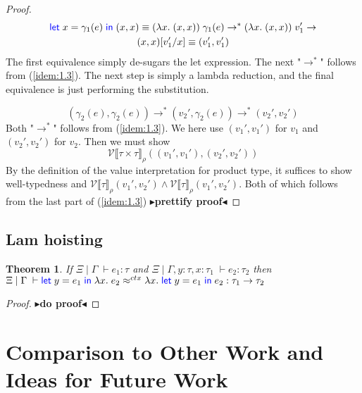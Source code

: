 \documentclass[twoside,11pt,openright]{report}
\newtheorem{theorem}{Theorem}
\theoremstyle{definition}
\newcommand{\var}{x}
\newcommand{\varB}{y}
\newcommand{\expr}{e}
\newcommand{\val}{v}
\newcommand{\subst}[3]{#1{\left[#3 \middle/ #2 \right]}}
\newcommand{\Tprod}[2]{#1 \times #2}
\newcommand{\Tfunc}[2]{#1 \rightarrow #2}
\newcommand{\typ}{\tau}
\newcommand{\venv}{\Gamma}
\newcommand{\tenv}{\Xi}
\newcommand{\jdg}[4]{#1 \; | \; #2 \; \vdash #3 : #4}
\newcommand{\jdgRel}[6]{#1 \; | \; #2 \; \vdash #3 \approx^{#4} #5 : #6}
\newcommand{\ctxRel}[5]{\jdgRel{#1}{#2}{#3}{ctx}{#4}{#5}}
\newcommand{\step}{\rightarrow}
\newcommand{\stepS}{\rightarrow^*}
\newcommand{\ValInp}[2]{\mathcal{V} \llbracket #1 \rrbracket_{#2}}
\newcommand{\todo}[1]{{\color[rgb]{.5,0,0}\textbf{$\blacktriangleright$#1$\blacktriangleleft$}}}
\begin{document}
\begin{proof}
  \begin{multline}
    \Let \var = \gamma_1(\expr) in (\var, \var) \equiv (\fun \var . (\var, \var)) \; \gamma_1(\expr) \stepS (\fun \var . (\var, \var)) \; \val_1' \step\\ \subst{(\var, \var)}{\var}{\val_1'} \equiv (\val_1', \val_1')
  \end{multline}
  The first equivalence simply de-sugars the let expression. The next "$\stepS$" follows from (\ref{idem:1.3}). The next step is simply a lambda reduction, and the final equivalence is just performing the substitution.

  \begin{equation}
    (\gamma_2(\expr), \gamma_2(\expr)) \stepS (\val_2', \gamma_2(\expr)) \stepS (\val_2', \val_2')
  \end{equation}
  Both "$\stepS$" follows from (\ref{idem:1.3}).
  We here use $(\val_1', \val_1')$ for $\val_1$ and $(\val_2', \val_2')$ for $\val_2$. Then we must show
  \begin{equation}
    \ValInp{\Tprod{\typ}{\typ}}{\rho}((\val_1', \val_1'), (\val_2', \val_2'))\label{idem:goal_final}
  \end{equation}
  By the definition of the value interpretation for product type, it suffices to show well-typedness and $\ValInp{\typ}{\rho}(\val_1', \val_2') \land \ValInp{\typ}{\rho}(\val_1', \val_2')$. Both of which follows from the last part of (\ref{idem:1.3})
  \todo{prettify proof}
\end{proof}


\section{Lam hoisting}

\begin{theorem}
  If $\jdg{\tenv}{\venv}{\expr_1}{\typ}$ and $\jdg{\tenv}{\venv, \varB : \typ, \var : \typ_1}{\expr_2}{\typ_2}$ then\\
  $\ctxRel{\tenv}{\venv}{\Let \varB = \expr_1 in \fun \var . \expr_2}{\fun \var . \Let \varB = \expr_1 in \expr_2}{\Tfunc{\typ_1}{\typ_2}}$
\end{theorem}
\begin{proof}
  \todo{do proof}
\end{proof}



\chapter{Comparison to Other Work and Ideas for Future Work}
\label{ch:COWFW}
\end{document}
